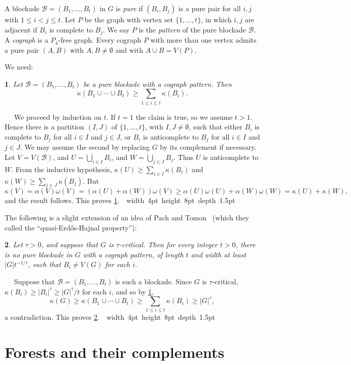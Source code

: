 \documentclass[titlepage,11pt]{article}
\newcommand\blackslug{\hbox{\hskip 1pt \vrule width 4pt height 8pt depth 1.5pt
        \hskip 1pt}}
\newcommand\bbox{\hfill \quad \blackslug \bigbreak}
\def\ll{,\ldots,}
\def\cupcup{\cup\cdots\cup}
\newtheorem{thm}{}[section]
\newcommand{\Proof}{\noindent{\bf Proof.}\ \ }
\begin{document}
A blockade $\mathcal{B}=(B_1\ll B_t)$ in $G$ is {\em pure} if $(B_i, B_j)$
is a pure pair for all $i,j$ with $1\le i<j\le t$.
Let $P$ be the graph with vertex
set $\{1\ll t\}$, in which $i,j$ are adjacent if $B_i$ is complete to $B_j$. We say $P$ is the {\em pattern} of the
pure blockade $\mathcal{B}$. A {\em cograph} is a $P_4$-free graph. Every cograph $P$ with more than one vertex admits a pure pair
$(A,B)$ with $A,B\ne \emptyset$ and with $A\cup B=V(P)$.

We need:
\begin{thm}\label{cographpattern}
Let $\mathcal{B}=(B_1\ll B_t)$ be a pure blockade with a cograph pattern.
Then
$$\kappa(B_1\cupcup B_t)\ge \sum_{1\le i\le t}\kappa(B_i).$$
\end{thm}
\Proof
We proceed by induction on $t$. If $t=1$ the claim is true, so we assume $t>1$. Hence
there is a partition $(I,J)$ of
$\{1\ll t\}$, with $I,J\ne \emptyset$, such that either $B_i$ is complete to $B_j$ for all $i\in I$ and $j\in J$, or
$B_i$ is anticomplete to $B_j$ for all $i\in I$ and $j\in J$. We may assume the second by replacing $G$ by its complement if necessary.
Let $V=V(\mathcal{B})$, and
$U=\bigcup_{i\in I}B_i$, and $W=\bigcup_{j\in J} B_j$. Thus $U$ is anticomplete to $W$.
From the inductive hypothesis, $\kappa(U)\ge   \sum_{i\in I}\kappa(B_i)$ and $\kappa(W)\ge  \sum_{j\in J}\kappa(B_j)$. But
$$\kappa(V)=\alpha(V)\omega(V)= (\alpha(U)+\alpha(W))\omega(V)\ge \alpha(U)\omega(U)+\alpha(W)\omega(W)=\kappa(U)+\kappa(W),$$
and the result follows. This proves \ref{cographpattern}.~\bbox

The following is a slight extension of an idea of Pach and Tomon~\cite{pach} (which they called the ``quasi-Erd\H{o}s-Hajnal property''):
\begin{thm}\label{parties}
Let $\tau>0$, and suppose that $G$ is $\tau$-critical.
Then for every integer $t>0$, there is no pure blockade in $G$ with a cograph pattern,
of length $t$ and width at least $|G|t^{-1/\tau}$, such that $B_i\ne V(G)$ for each $i$.
\end{thm}
\Proof
Suppose that $\mathcal{B}=(B_1\ll B_t)$ is such a blockade. Since $G$ is $\tau$-critical, $\kappa(B_i)\ge |B_i|^\tau\ge |G|^\tau/t$ for each $i$,
and so by \ref{cographpattern},
$$\kappa(G)\ge \kappa(B_1\cupcup B_t)\ge \sum_{1\le i\le t}\kappa(B_i)\ge |G|^\tau,$$
a contradiction. This proves \ref{parties}.~\bbox

\section{Forests and their complements}
\end{document}
